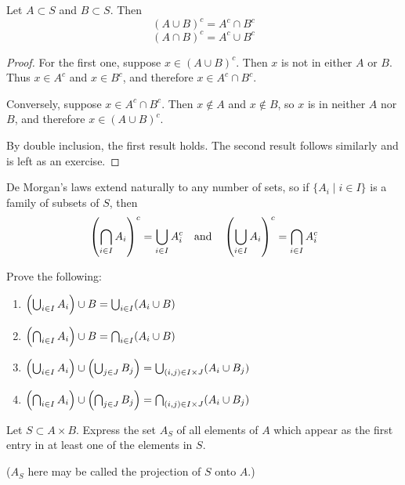 \begin{proposition}
Let $A \subset S$ and $B \subset S$. Then
\begin{equation}
(A \cup B)^c = A^c \cap B^c
\end{equation}
\begin{equation}
(A \cap B)^c = A^c \cup B^c
\end{equation}
\end{proposition}
\begin{proof}
For the first one, suppose $x \in (A \cup B)^c$. Then $x$ is not in either $A$ or $B$. Thus $x \in A^c$ and $x \in B^c$, and therefore $x \in A^c \cap B^c$. 

Conversely, suppose $x \in A^c \cap B^c$. Then $x \notin A$ and $x \notin B$, so $x$ is in neither $A$ nor $B$, and therefore $x \in (A \cup B)^c$.

By double inclusion, the first result holds. The second result follows similarly and is left as an exercise.
\end{proof}

De Morgan’s laws extend naturally to any number of sets, so if $\{A_i \mid i \in I\}$ is a family of subsets of $S$, then
\[ \left(\bigcap_{i\in I}A_i\right)^c = \bigcup_{i\in I}A_i^c \quad \text{and} \quad \left(\bigcup_{i\in I}A_i\right)^c = \bigcap_{i\in I}A_i^c \]

\begin{exercise}{}{}
Prove the following:
\begin{enumerate}
\item $\left(\bigcup_{i\in I}A_i\right)\cup B=\bigcup_{i\in I}(A_i\cup B)$
\item $\left(\bigcap_{i\in I}A_i\right)\cup B=\bigcap_{i\in I}(A_i\cup B)$
\item $\left(\bigcup_{i\in I}A_i\right)\cup\left(\bigcup_{j\in J}B_j\right)=\bigcup_{(i,j)\in I\times J}(A_i\cup B_j)$
\item $\left(\bigcap_{i\in I}A_i\right)\cup\left(\bigcap_{j\in J}B_j\right)=\bigcap_{(i,j)\in I\times J}(A_i\cup B_j)$
\end{enumerate}
\end{exercise}

\begin{exercise}{}{}
Let $S\subset A\times B$. Express the set $A_S$ of all elements of $A$ which appear as the first entry in at least one of the elements in $S$.

($A_S$ here may be called the projection of $S$ onto $A$.)
\end{exercise}

